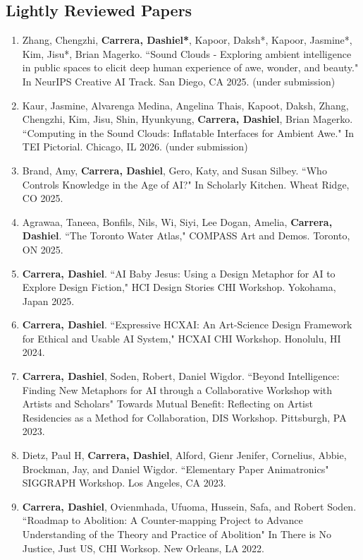 \subsection{Lightly Reviewed Papers}
\begin{enumerate}

\item Zhang, Chengzhi, \textbf{Carrera, Dashiel*}, Kapoor, Daksh*, Kapoor, Jasmine*, Kim, Jisu*, Brian Magerko. ``Sound Clouds - Exploring ambient intelligence in public spaces to elicit deep human experience of awe, wonder, and beauty." In NeurIPS Creative AI Track. San Diego, CA 2025. (under submission)

\item Kaur, Jasmine, Alvarenga Medina, Angelina Thais, Kapoot, Daksh, Zhang, Chengzhi, Kim, Jisu, Shin, Hyunkyung, \textbf{Carrera, Dashiel}, Brian Magerko. ``Computing in the Sound Clouds: Inflatable Interfaces for Ambient Awe." In TEI Pictorial. Chicago, IL 2026. (under submission) \\

 \item Brand, Amy, \textbf{Carrera, Dashiel}, Gero, Katy, and Susan Silbey. ``Who Controls Knowledge in the Age of AI?" In Scholarly Kitchen. Wheat Ridge, CO 2025. \\
 \item Agrawaa, Taneea, Bonfils, Nils, Wi, Siyi, Lee Dogan, Amelia, \textbf{Carrera, Dashiel}. ``The Toronto Water Atlas," COMPASS Art and Demos. Toronto, ON 2025. \\
 \item \textbf{Carrera, Dashiel}. ``AI Baby Jesus: Using a Design Metaphor for AI to Explore Design Fiction," HCI Design Stories CHI Workshop. Yokohama, Japan 2025. \\
 \item \textbf{Carrera, Dashiel}. ``Expressive HCXAI: An Art-Science Design Framework for Ethical and Usable AI System," HCXAI CHI Workshop. Honolulu, HI 2024. \\
  \item \textbf{Carrera, Dashiel}, Soden, Robert, Daniel Wigdor. ``Beyond Intelligence: Finding New Metaphors for AI through a Collaborative Workshop with Artists and Scholars" Towards Mutual Benefit: Reflecting on Artist Residencies as a Method for Collaboration, DIS Workshop. Pittsburgh, PA 2023. \\
   \item  Dietz, Paul H, \textbf{Carrera, Dashiel}, Alford, Gienr Jenifer, Cornelius, Abbie, Brockman, Jay, and Daniel Wigdor. ``Elementary Paper Animatronics" SIGGRAPH Workshop. Los Angeles, CA 2023. \\
  \item \textbf{Carrera, Dashiel}, Ovienmhada, Ufuoma, Hussein, Safa, and Robert Soden. ``Roadmap to Abolition: A Counter-mapping Project to Advance Understanding of the Theory and Practice of Abolition" In There is No Justice, Just US, CHI Worksop. New Orleans, LA 2022. 
  \end{enumerate}
  
